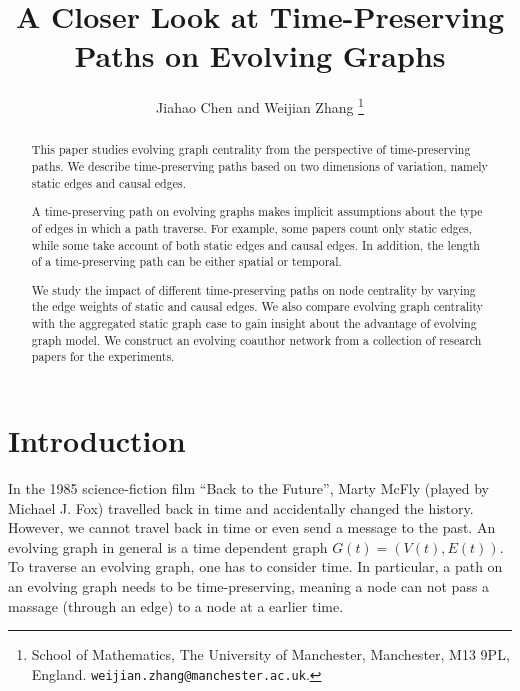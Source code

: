 \documentclass[12pt]{article}
\title{A Closer Look at Time-Preserving Paths on Evolving Graphs}
\author{Jiahao Chen and
Weijian Zhang
\thanks{%
  School of Mathematics,
The University of Manchester,
                Manchester, M13 9PL, England.
\texttt{weijian.zhang@manchester.ac.uk}.
}
}
\theoremstyle{definition}
\begin{document}


\maketitle

\begin{abstract}
This paper studies evolving graph centrality from the perspective of time-preserving paths. We describe time-preserving paths based on two dimensions of variation, namely static edges and causal edges.

A time-preserving path on evolving graphs makes implicit assumptions about the type of edges in which a path traverse. For example, some papers count only static edges,
while some take account of both static edges and causal edges. In addition, the length of a time-preserving path can be either spatial or temporal.

We study the impact of different time-preserving paths on node centrality by varying the edge weights of static and causal edges.
We also compare evolving graph centrality with the aggregated static graph case to gain insight about the advantage of evolving graph model.
We construct an evolving coauthor network from a collection of research papers for the experiments.
\end{abstract}

\section{Introduction}
\label{sec:introduction}

In the 1985 science-fiction film ``Back to the Future'', Marty McFly (played by Michael J. Fox) travelled back in time and accidentally changed the history.
However, we cannot travel back in time or even send a message to the past.
An evolving graph in general is a time dependent graph $G(t) = (V(t), E(t))$.
To traverse an evolving graph, one has to consider time. In particular, a path on an evolving graph needs to be time-preserving, meaning a node can not pass a massage (through an edge) to a node at a earlier time.
\end{document}
